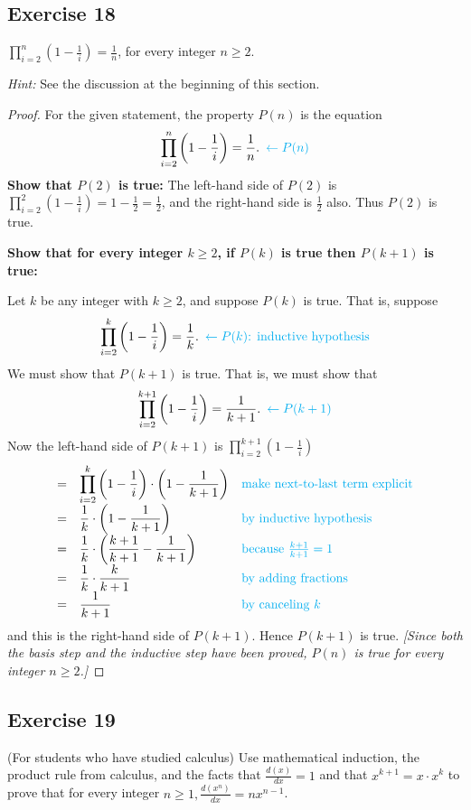 \documentclass[14pt]{extarticle}
\newcommand{\dps}{\displaystyle}
\newcommand{\from}{\leftarrow}
\newcommand{\cy}{\color{cyan}}
\begin{document}
\subsection{Exercise 18}
$\dps \prod_{i=2}^{n}\left(1 - \frac{1}{i}\right) = \frac{1}{n}$, for every integer $n \geq 2$.

{\it Hint:} See the discussion at the beginning of this section.

\begin{proof}
For the given statement, the property $P(n)$ is the equation
\[
\dps \prod_{i=2}^{n}\left(1 - \frac{1}{i}\right) = \frac{1}{n}. \,\,\, {\cy \from P(n)}
\]
{\bf Show that $P(2)$ is true:} The left-hand side of $P(2)$ is $\dps \prod_{i=2}^{2}\left(1 - \frac{1}{i}\right) = 1 - \frac{1}{2} = \frac{1}{2}$, and the right-hand side is $\dps \frac{1}{2}$ also. Thus $P(2)$ is true.

{\bf Show that for every integer $k \geq 2$, if $P(k)$ is true then $P(k + 1)$ is true:}

Let $k$ be any integer with $k \geq 2$, and suppose $P(k)$ is true. That is, suppose
\[
\dps \prod_{i=2}^{k}\left(1 - \frac{1}{i}\right) = \frac{1}{k}. \,\,\, {\cy \from P(k) \text{: inductive hypothesis}}
\]
We must show that $P(k + 1)$ is true. That is, we must show that
\[
\dps \prod_{i=2}^{k+1}\left(1 - \frac{1}{i}\right) = \frac{1}{k+1}. \,\,\,{\cy \from P(k+1)}
\]
Now the left-hand side of $P(k + 1)$ is $\dps \prod_{i=2}^{k+1}\left(1 - \frac{1}{i}\right)$
\[
\begin{array}{lll}
= & \dps \prod_{i=2}^{k}\left(1 - \frac{1}{i}\right) \cdot \left(1 - \frac{1}{k+1}\right) & \text{\cy make next-to-last term explicit} \\
= & \dps \frac{1}{k} \cdot \left(1 - \frac{1}{k+1}\right) & \text{\cy by inductive hypothesis} \\
= & \dps \frac{1}{k} \cdot \left(\frac{k+1}{k+1} - \frac{1}{k+1}\right) & \text{\cy because $\frac{k+1}{k+1} = 1$} \\
= & \dps \frac{1}{k} \cdot \frac{k}{k+1} & \text{\cy by adding fractions} \\
= & \dps \frac{1}{k+1} & \text{\cy by canceling $k$}
\end{array}
\]
and this is the right-hand side of $P(k + 1)$. Hence $P(k + 1)$ is true. {\it [Since both the basis step and the inductive step have been proved, $P(n)$ is true for every integer $n \geq 2$.]}
\end{proof}

\subsection{Exercise 19}
(For students who have studied calculus) Use mathematical induction, the product rule from calculus, and the facts that $\dps \frac{d(x)}{dx} = 1$ and that $x^{k+1} = x\cdot x^k$ to prove that for every integer $\dps n \geq 1, \frac{d(x^n)}{dx} = n x^{n-1}$.
\end{document}
